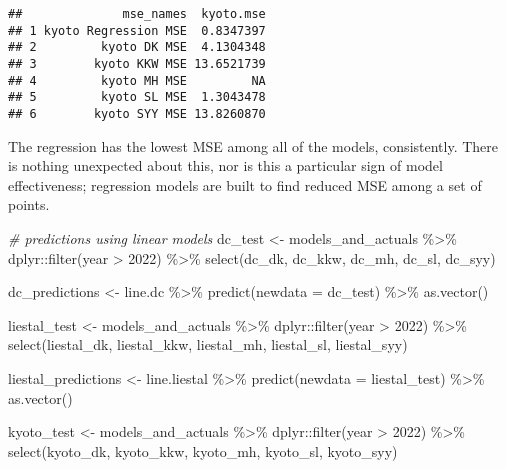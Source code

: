 \documentclass[
]{article}
\newenvironment{Shaded}{\begin{snugshade}}{\end{snugshade}}
\newcommand{\AttributeTok}[1]{\textcolor[rgb]{0.77,0.63,0.00}{#1}}
\newcommand{\CommentTok}[1]{\textcolor[rgb]{0.56,0.35,0.01}{\textit{#1}}}
\newcommand{\DecValTok}[1]{\textcolor[rgb]{0.00,0.00,0.81}{#1}}
\newcommand{\FunctionTok}[1]{\textcolor[rgb]{0.00,0.00,0.00}{#1}}
\newcommand{\NormalTok}[1]{#1}
\newcommand{\OtherTok}[1]{\textcolor[rgb]{0.56,0.35,0.01}{#1}}
\newcommand{\SpecialCharTok}[1]{\textcolor[rgb]{0.00,0.00,0.00}{#1}}
\begin{document}
\begin{verbatim}
##              mse_names  kyoto.mse
## 1 kyoto Regression MSE  0.8347397
## 2         kyoto DK MSE  4.1304348
## 3        kyoto KKW MSE 13.6521739
## 4         kyoto MH MSE         NA
## 5         kyoto SL MSE  1.3043478
## 6        kyoto SYY MSE 13.8260870
\end{verbatim}

The regression has the lowest MSE among all of the models, consistently.
There is nothing unexpected about this, nor is this a particular sign of
model effectiveness; regression models are built to find reduced MSE
among a set of points.

\begin{Shaded}
\begin{Highlighting}[]
\CommentTok{\# predictions using linear models}
\NormalTok{dc\_test }\OtherTok{\textless{}{-}}\NormalTok{ models\_and\_actuals }\SpecialCharTok{\%\textgreater{}\%}
\NormalTok{  dplyr}\SpecialCharTok{::}\FunctionTok{filter}\NormalTok{(year }\SpecialCharTok{\textgreater{}} \DecValTok{2022}\NormalTok{) }\SpecialCharTok{\%\textgreater{}\%}
  \FunctionTok{select}\NormalTok{(dc\_dk, dc\_kkw, dc\_mh, dc\_sl, dc\_syy)}

\NormalTok{dc\_predictions }\OtherTok{\textless{}{-}}\NormalTok{ line.dc }\SpecialCharTok{\%\textgreater{}\%}
  \FunctionTok{predict}\NormalTok{(}\AttributeTok{newdata =}\NormalTok{ dc\_test) }\SpecialCharTok{\%\textgreater{}\%}
  \FunctionTok{as.vector}\NormalTok{()}

\NormalTok{liestal\_test }\OtherTok{\textless{}{-}}\NormalTok{ models\_and\_actuals }\SpecialCharTok{\%\textgreater{}\%}
\NormalTok{  dplyr}\SpecialCharTok{::}\FunctionTok{filter}\NormalTok{(year }\SpecialCharTok{\textgreater{}} \DecValTok{2022}\NormalTok{) }\SpecialCharTok{\%\textgreater{}\%}
  \FunctionTok{select}\NormalTok{(liestal\_dk, liestal\_kkw, liestal\_mh, liestal\_sl, liestal\_syy)}

\NormalTok{liestal\_predictions }\OtherTok{\textless{}{-}}\NormalTok{ line.liestal }\SpecialCharTok{\%\textgreater{}\%}
  \FunctionTok{predict}\NormalTok{(}\AttributeTok{newdata =}\NormalTok{ liestal\_test) }\SpecialCharTok{\%\textgreater{}\%}
  \FunctionTok{as.vector}\NormalTok{()}

\NormalTok{kyoto\_test }\OtherTok{\textless{}{-}}\NormalTok{ models\_and\_actuals }\SpecialCharTok{\%\textgreater{}\%}
\NormalTok{  dplyr}\SpecialCharTok{::}\FunctionTok{filter}\NormalTok{(year }\SpecialCharTok{\textgreater{}} \DecValTok{2022}\NormalTok{) }\SpecialCharTok{\%\textgreater{}\%}
  \FunctionTok{select}\NormalTok{(kyoto\_dk, kyoto\_kkw, kyoto\_mh, kyoto\_sl, kyoto\_syy)}


\end{Highlighting}
\end{Shaded}
\end{document}
